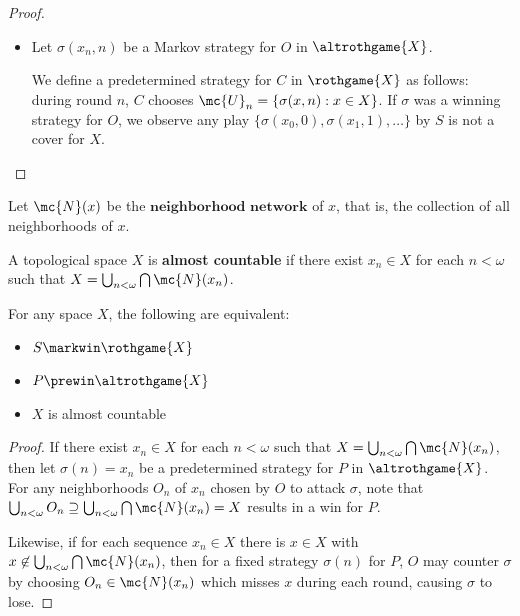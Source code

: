 \begin{proof}
\begin{itemize}
      \item
      Let $\sigma(x_n,n)$ be a Markov strategy for $O$ in $\altrothgame{X}$.

      We define a predetermined strategy for $C$ in $\rothgame{X}$ as follows: during round $n$, $C$ chooses $\mc{U}_n = \{\sigma(x,n) : x\in X\}$. If $\sigma$ was a winning strategy for $O$, we observe any play $\{\sigma(x_0,0),\sigma(x_1,1),\dots\}$ by $S$ is not a cover for $X$.

    \end{itemize}

  \end{proof}

  \begin{defn}
    Let $\mc{N}(x)$ be the $\textbf{neighborhood network}$ of $x$, that is, the collection of all neighborhoods of $x$.
  \end{defn}

  \begin{defn}
    A topological space $X$ is \textbf{almost countable} if there exist $x_n\in X$ for each $n<\omega$ such that $X=\bigcup_{n<\omega}\bigcap\mc{N}(x_n)$.
  \end{defn}

  \begin{thm}
    For any space $X$, the following are equivalent:
    \begin{itemize}
      \item $S\markwin\rothgame{X}$ 
      \item $P\prewin\altrothgame{X}$
      \item $X$ is almost countable
    \end{itemize}
  \end{thm}

  \begin{proof}
    If there exist $x_n\in X$ for each $n<\omega$ such that $X=\bigcup_{n<\omega}\bigcap\mc{N}(x_n)$, then let $\sigma(n)=x_n$ be a predetermined strategy for $P$ in $\altrothgame{X}$. For any neighborhoods $O_n$ of $x_n$ chosen by $O$ to attack $\sigma$, note that $\bigcup_{n<\omega}O_n\supseteq\bigcup_{n<\omega}\bigcap\mc{N}(x_n)=X$ results in a win for $P$.

    Likewise, if for each sequence $x_n \in X$ there is $x\in X$ with $x\not\in \bigcup_{n<\omega}\bigcap\mc{N}(x_n)$, then for a fixed strategy $\sigma(n)$ for $P$, $O$ may counter $\sigma$ by choosing $O_n\in\mc{N}(x_n)$ which misses $x$ during each round, causing $\sigma$ to lose.
  \end{proof}

